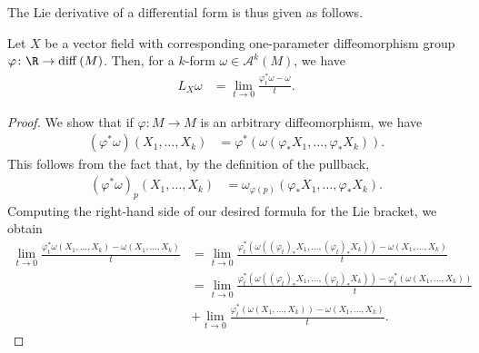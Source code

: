 \documentclass[10pt]{mypackage}
\begin{document}
The Lie derivative of a differential form is thus given as follows.
\begin{proposition}
  Let $X$ be a vector field with corresponding one-parameter diffeomorphism group $\varphi\colon \R\rightarrow \operatorname{diff}\left( M \right)$. Then, for a $k$-form $\omega\in \mathcal{A}^{k}\left( M \right)$, we have
  \begin{align*}
    L_X\omega &= \lim_{t\rightarrow 0} \frac{\varphi_t^{\ast}\omega - \omega}{t}.
  \end{align*}
\end{proposition}
\begin{proof}
  We show that if $\varphi\colon M\rightarrow M$ is an arbitrary diffeomorphism, we have
  \begin{align*}
    \left( \varphi^{\ast}\omega \right)\left( X_1,\dots,X_k \right) &= \varphi^{\ast}\left( \omega\left( \varphi_{\ast}X_1,\dots,\varphi_{\ast}X_k \right) \right).
  \end{align*}
  This follows from the fact that, by the definition of the pullback,
  \begin{align*}
    \left( \varphi^{\ast}\omega \right)_{p}\left( X_1,\dots,X_k \right) &= \omega_{\varphi(p)}\left( \varphi_{\ast}X_1,\dots,\varphi_{\ast}X_k \right).
  \end{align*}
  Computing the right-hand side of our desired formula for the Lie bracket, we obtain
  \begin{align*}
    \lim_{t\rightarrow 0} \frac{\varphi_t^{\ast}\omega\left( X_1,\dots,X_k \right) - \omega\left( X_1,\dots,X_k \right)}{t} &= \lim_{t\rightarrow 0} \frac{\varphi_t^{\ast}\left( \omega\left( \left( \varphi_t \right)_{\ast}X_1,\dots,\left( \varphi_t \right)_{\ast}X_k \right) \right) - \omega\left( X_1,\dots,X_k \right)}{t}\\
                                                                                                                                  &= \lim_{t\rightarrow 0} \frac{\varphi_t^{\ast}\left( \omega\left( \left( \varphi_t \right)_{\ast}X_1,\dots,\left( \varphi_t \right)_{\ast}X_k \right) \right) - \varphi_t^{\ast}\left( \omega\left( X_1,\dots,X_k \right) \right)}{t}\\
                                                                                                                                                                                                                                &+ \lim_{t\rightarrow 0} \frac{\varphi_t^{\ast}\left( \omega\left( X_1,\dots,X_k \right) \right) - \omega\left( X_1,\dots,X_k \right)}{t}.

\end{align*}
\end{proof}
\end{document}

